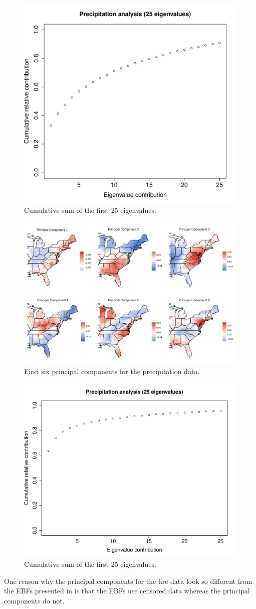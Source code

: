 \documentclass[11pt]{article}
\begin{document}
\begin{figure}[htbp] %
  \centering
  \includegraphics[width=0.5\linewidth]{plots/firelambda-25.pdf}
  \caption{Cumulative sum of the first 25 eigenvalues.}
  \label{ebfig:fire-eigpanel}
\end{figure}

\begin{figure}[htbp]  %
  \centering
  \includegraphics[width=\linewidth]{plots/precip-eig-panel.pdf}
  \caption{First six principal components for the precipitation data.}
  \label{ebfig:precip-eigpanel}
\end{figure}

\begin{figure}[htbp]  %
  \centering
  \includegraphics[width=0.5\linewidth]{plots/preciplambda-25.pdf}
  \caption{Cumulative sum of the first 25 eigenvalues.}
  \label{ebfig:precip-eigpanel}
\end{figure}

One reason why the principal components for the fire data look so different from the EBFs presented in  is that the EBFs use censored data whereas the principal components do not.

\begin{singlespace}


\end{singlespace}
\end{document}
